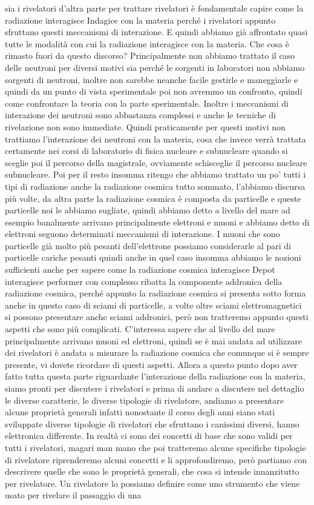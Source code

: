 sia i rivelatori d'altra parte per trattare rivelatori è fondamentale capire come la radiazione interagisce Indagice con la materia perché i rivelatori appunto sfruttano questi meccanismi di interazione. E quindi abbiamo già affrontato quasi tutte le modalità con cui la radiazione interagisce con la materia. Che cosa è rimasto fuori da questo discorso? Principalmente non abbiamo trattato il caso delle neutroni per diversi motivi sia perché le sorgenti in laboratori non abbiamo sorgenti di neutroni, inoltre non sarebbe neanche facile gestirle e maneggiarle e quindi da un punto di vista sperimentale poi non avremmo un confronto, quindi come confrontare la teoria con la parte sperimentale. Inoltre i meccanismi di interazione dei neutroni sono abbastanza complessi e anche le tecniche di rivelazione non sono immediate. Quindi praticamente per questi motivi non trattiamo l'interazione dei neutroni con la materia, cosa che invece verrà trattata certamente nei corsi di laboratorio di fisica nucleare e subnucleare quando si sceglie poi il percorso della magistrale, ovviamente schisceglie il percorso nucleare subnucleare. Poi per il resto insomma ritengo che abbiamo trattato un po' tutti i tipi di radiazione anche la radiazione cosmica tutto sommato, l'abbiamo discursa più volte, da altra parte la radiazione cosmica è composta da particelle e queste particelle noi le abbiamo sugliate, quindi abbiamo detto a livello del mare ad esempio banalmente arrivano principalmente elettroni e muoni e abbiamo detto di elettroni seguono determinati meccanismi di interazione. I muoni che sono particelle già molto più pesanti dell'elettrone possiamo considerarle al pari di particelle cariche pesanti quindi anche in quel caso insomma abbiamo le nozioni sufficienti anche per sapere come la radiazione cosmica interagisce Depot interagisce performer con complesso ribatta la componente addronica della radiazione cosmica, perché appunto la radiazione cosmica si presenta sotto forma anche in questo caso di sciami di particelle, a volte oltre sciami elettromagnetici si possono presentare anche sciami addronici, però non tratteremo appunto questi aspetti che sono più complicati. C'interessa sapere che al livello del mare principalmente arrivano muoni ed elettroni, quindi se è mai andata ad utilizzare dei rivelatori è andata a misurare la radiazione cosmica che comunque si è sempre presente, vi dovete ricordare di questi aspetti. Allora a questo punto dopo aver fatto tutta questa parte riguardante l'interazione della radiazione con la materia, siamo pronti per discutere i rivelatori e prima di andare a discutere nel dettaglio le diverse caratterie, le diverse tipologie di rivelatore, andiamo a presentare alcune proprietà generali infatti nonostante il corso degli anni siano stati sviluppate diverse tipologie di rivelatori che sfruttano i canissimi diversi, hanno elettronica differente. In realtà ci sono dei concetti di base che sono validi per tutti i rivelatori, magari man mano che poi tratteremo alcune specifiche tipologie di rivelatore riprenderemo alcuni concetti e li approfondiremo, però partiamo con descrivere quelle che sono le proprietà generali, che cosa si intende innanzitutto per rivelatore. Un rivelatore lo possiamo definire come uno strumento che viene usato per rivelare il passaggio di una 